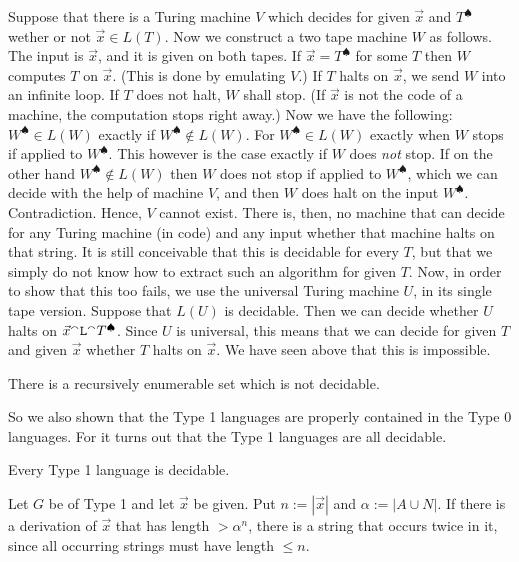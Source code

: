 Suppose that there is a Turing machine $V$ which decides for
given $\vec{x}$ and $T^{\spadesuit}$ wether or not $\vec{x} \in L(T)$.
Now we construct a two tape machine $W$ as follows. The input is
$\vec{x}$, and it is given on both tapes. If $\vec{x} =
T^{\spadesuit}$ for some $T$ then $W$ computes $T$ on $\vec{x}$.
(This is done by emulating $V$.) If $T$ halts on $\vec{x}$,
we send $W$ into an infinite loop. If $T$ does not halt,
$W$ shall stop. (If $\vec{x}$ is not the code of a machine,
the computation stops right away.) Now we have the following:
$W^{\spadesuit} \in L(W)$ exactly if $W^{\spadesuit} \not\in
L(W)$. For $W^{\spadesuit} \in L(W)$ exactly when $W$ stops
if applied to $W^{\spadesuit}$. This however is the case exactly
if $W$ does {\it not\/} stop. If on the other hand $W^{\spadesuit}
\not\in L(W)$ then $W$ does not stop if applied to $W^{\spadesuit}$,
which we can decide with the help of machine $V$, and then $W$
does halt on the input  $W^{\spadesuit}$.  Contradiction. Hence,
$V$ cannot exist. There is, then, no machine that can decide for
any Turing machine (in code) and any input whether that machine
halts on that string. It is still conceivable that this is
decidable for every $T$, but that we simply do
not know how to extract such an algorithm for given $T$.
Now, in order to show that this too fails, we use the universal
Turing machine $U$, in its single tape version. Suppose that $L(U)$
is decidable.  Then we can decide whether $U$ halts on
$\vec{x}{^{\smallfrown}} \mbox{\tt L}{^{\smallfrown}} T^{\spadesuit}$. Since $U$ 
is universal, this means that we can decide for given $T$ and 
given $\vec{x}$ whether $T$ halts on $\vec{x}$. We have seen 
above that this is impossible.
\nocite{markov:impossibility}%
\nocite{post:thue}%
\begin{thm}
There is a recursively enumerable set which is not
decidable. 
\end{thm}
So we also shown that the Type 1 languages are properly contained
in the Type 0 languages. For it turns out that the Type 1
languages are all decidable.
\begin{thm}[Chomsky]
Every Type 1 language is decidable.
\end{thm}
\proofbeg
Let $G$ be of Type 1 and let $\vec{x}$ be given. Put
$n := |\vec{x}|$ and $\alpha := |A \cup N|$. If there
is a derivation of $\vec{x}$ that has length $>
\alpha^n$, there is a string that occurs twice in it,
since all occurring strings must have length $\leq n$.

